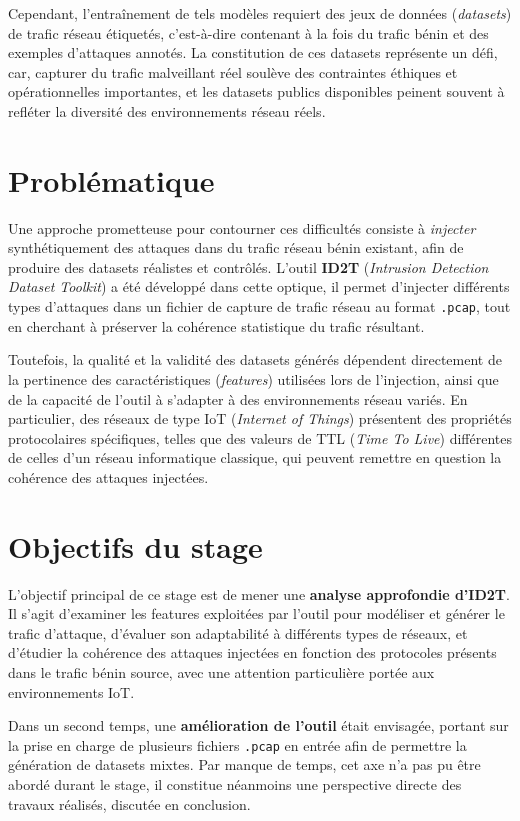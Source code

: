 \documentclass[12pt, a4paper]{report}
\begin{document}
Cependant, l'entraînement de tels modèles requiert des jeux de données (\textit{datasets}) de trafic réseau
étiquetés, c'est-à-dire contenant à la fois du trafic bénin et des exemples d'attaques annotés.
La constitution de ces datasets représente un défi, car, capturer du trafic malveillant réel soulève des
contraintes éthiques et opérationnelles importantes, et les datasets publics disponibles peinent souvent
à refléter la diversité des environnements réseau réels.
 
\section{Problématique}
 
Une approche prometteuse pour contourner ces difficultés consiste à \textit{injecter} synthétiquement des
attaques dans du trafic réseau bénin existant, afin de produire des datasets réalistes et contrôlés.
L'outil \textbf{ID2T} (\textit{Intrusion Detection Dataset Toolkit}) a été développé dans cette optique, il permet d'injecter différents types d'attaques dans un fichier de capture de trafic réseau au format \texttt{.pcap}, tout en cherchant à préserver la cohérence statistique du trafic résultant.
 
Toutefois, la qualité et la validité des datasets générés dépendent directement de la pertinence des
caractéristiques (\textit{features}) utilisées lors de l'injection, ainsi que de la capacité de l'outil à
s'adapter à des environnements réseau variés.
En particulier, des réseaux de type IoT (\textit{Internet of Things}) présentent des propriétés protocolaires
spécifiques, telles que des valeurs de TTL (\textit{Time To Live}) différentes de celles d'un réseau
informatique classique, qui peuvent remettre en question la cohérence des attaques injectées.
 
\section{Objectifs du stage}
 
L'objectif principal de ce stage est de mener une \textbf{analyse approfondie d'ID2T}.
Il s'agit d'examiner les features exploitées par l'outil pour modéliser et générer le trafic d'attaque,
d'évaluer son adaptabilité à différents types de réseaux, et d'étudier la cohérence des attaques injectées
en fonction des protocoles présents dans le trafic bénin source, avec une attention particulière portée
aux environnements IoT.
 
Dans un second temps, une \textbf{amélioration de l'outil} était envisagée, portant sur la prise en charge
de plusieurs fichiers \texttt{.pcap} en entrée afin de permettre la génération de datasets mixtes.
Par manque de temps, cet axe n'a pas pu être abordé durant le stage, il constitue néanmoins une perspective directe des travaux réalisés, discutée en conclusion.
 
\end{document}
